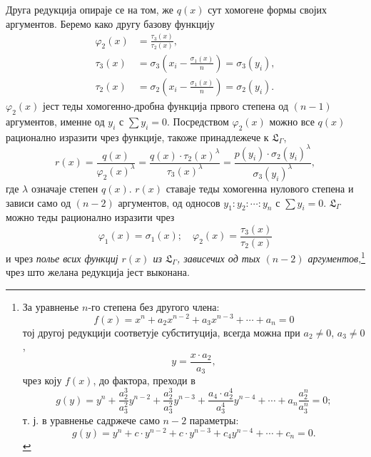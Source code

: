 ﻿\documentclass[11pt]{article}
\begin{document}
Друга редукција опираје се на том, же $q(x)$ сут хомогене формы својих аргументов. Беремо како другу базову функцију
\[
\begin{aligned}
\varphi_2(x)&=\frac{\tau_3(x)}{\tau_2(x)},\\
\tau_3(x)&=\sigma_3\left(x_i-\frac{\sigma_1(x)}{n}\right)=\sigma_3(y_i),\\
\tau_2(x)&=\sigma_2\left(x_i-\frac{\sigma_1(x)}{n}\right)=\sigma_2(y_i).
\end{aligned}
\]
$\varphi_2(x)$ јест теды хомогенно-дробна функција првого степена од $(n-1)$ аргументов, именне од $y_i$ с $\sum y_i=0$. Посредством $\varphi_2(x)$ можно все $q(x)$ рационално изразити чрез функције, такоже принадлежече к $\mathfrak L_\Gamma$,
\[
r(x)=\frac{q(x)}{\varphi_2(x)^\lambda}=\frac{q(x)\cdot\tau_2(x)^\lambda}{\tau_3(x)^\lambda}=\frac{p(y_i)\cdot\sigma_2(y_i)^\lambda}{\sigma_3(y_i)^\lambda},
\]
где $\lambda$ означаје степен $q(x)$. $r(x)$ ставаје теды хомогенна нулового степена и зависи само од $(n-2)$ аргументов, од односов $y_1:y_2:\cdots:y_n$ с $\sum y_i=0$. $\mathfrak L_\Gamma$ можно теды рационално изразити чрез
\[
\varphi_1(x)=\sigma_1(x);\quad \varphi_2(x)=\frac{\tau_3(x)}{\tau_2(x)}
\]
и чрез {\itshape полье всих функциј $r(x)$ из $\mathfrak L_\Gamma$, зависечих од тых $(n-2)$ аргументов},\footnote{За уравненье $n$-го степена без другого члена:
\[
f(x)=x^n+a_2x^{n-2}+a_3x^{n-3}+\cdots+a_n=0
\]
тој другој редукцији соответује субституција, всегда можна при $a_2\neq0$, $a_3\neq0$,
\[
y=\frac{x\cdot a_2}{a_3},
\]
чрез коју $f(x)$, до фактора, преходи в
\[
g(y)=y^n+\frac{a_2^3}{a_3^2}y^{n-2}+\frac{a_2^3}{a_3^2}y^{n-3}+\frac{a_4\cdot a_2^4}{a_3^4}y^{n-4}+\cdots+a_n\frac{a_2^n}{a_3^n}=0;
\]
т. ј. в уравненье садржече само $n-2$ параметры:
\[
g(y)=y^n+c\cdot y^{n-2}+c\cdot y^{n-3}+c_4y^{n-4}+\cdots+c_n=0.
\]} чрез што желана редукција јест выконана.
\end{document}
